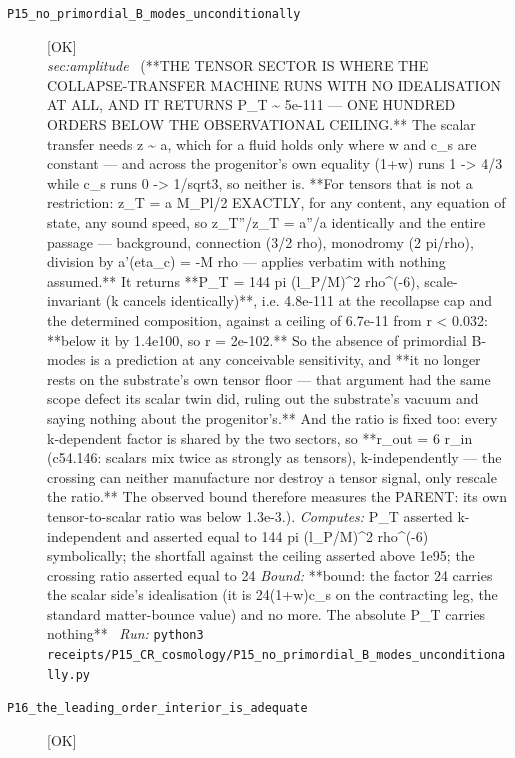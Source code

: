 \begin{description}
\item[\label{rcpt:P15_no_primordial_B_modes_unconditionally}\texttt{P15\_no\_primordial\_B\_modes\_unconditionally}]\hfill\textsf{[OK]}\\
\textit{sec:amplitude} \ (**THE TENSOR SECTOR IS WHERE THE COLLAPSE-TRANSFER MACHINE RUNS WITH NO IDEALISATION AT ALL, AND IT RETURNS P\_T \textasciitilde{} 5e-111 --- ONE HUNDRED ORDERS BELOW THE OBSERVATIONAL CEILING.** The scalar transfer needs z \textasciitilde{} a, which for a fluid holds only where w and c\_s are constant --- and across the progenitor's own equality (1+w) runs 1 -> 4/3 while c\_s runs 0 -> 1/sqrt3, so neither is. **For tensors that is not a restriction: z\_T = a M\_Pl/2 EXACTLY, for any content, any equation of state, any sound speed, so z\_T''/z\_T = a''/a identically and the entire passage --- background, connection (3/2 rho), monodromy (2 pi/rho), division by a'(eta\_c) = -M rho --- applies verbatim with nothing assumed.** It returns **P\_T = 144 pi (l\_P/M)\textasciicircum{}2 rho\textasciicircum{}(-6), scale-invariant (k cancels identically)**, i.e. 4.8e-111 at the recollapse cap and the determined composition, against a ceiling of 6.7e-11 from r < 0.032: **below it by 1.4e100, so r = 2e-102.** So the absence of primordial B-modes is a prediction at any conceivable sensitivity, and **it no longer rests on the substrate's own tensor floor --- that argument had the same scope defect its scalar twin did, ruling out the substrate's vacuum and saying nothing about the progenitor's.** And the ratio is fixed too: every k-dependent factor is shared by the two sectors, so **r\_out = 6 r\_in (c54.146: scalars mix twice as strongly as tensors), k-independently --- the crossing can neither manufacture nor destroy a tensor signal, only rescale the ratio.** The observed bound therefore measures the PARENT: its own tensor-to-scalar ratio was below 1.3e-3.). 
\emph{Computes:} P\_T asserted k-independent and asserted equal to 144 pi (l\_P/M)\textasciicircum{}2 rho\textasciicircum{}(-6) symbolically; the shortfall against the ceiling asserted above 1e95; the crossing ratio asserted equal to 24
 \emph{Bound:} **bound: the factor 24 carries the scalar side's idealisation (it is 24(1+w)c\_s on the contracting leg, the standard matter-bounce value) and no more. The absolute P\_T carries nothing**
\ \emph{Run:} \texttt{python3 receipts/P15\_CR\_cosmology/P15\_no\_primordial\_B\_modes\_unconditionally.py}
\item[\label{rcpt:P16_the_leading_order_interior_is_adequate}\texttt{P16\_the\_leading\_order\_interior\_is\_adequate}]\hfill\textsf{[OK]}\\

\end{description}
